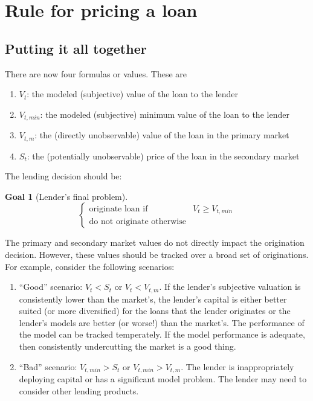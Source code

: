 \documentclass{article}
\theoremstyle{definition}
\newtheorem{goal}{Goal}
\begin{document}
\section{Rule for pricing a loan}


\subsection{Putting it all together}


There are now four formulas or values.  These are

\begin{enumerate}
	\item \(V_t\): the modeled (subjective) value of the loan to the lender
	\item \(V_{t, min}\): the modeled (subjective) minimum value of the loan to the lender
	\item \(V_{t, m}\): the (directly unobservable) value of the loan in the primary market
	\item \(S_t\): the (potentially unobservable) price of the loan in the secondary market
	
\end{enumerate}

The lending decision should be:


\begin{goal}[Lender's final problem] \label{lender3}
	\[
	\left\{
	\begin{array}{ll}
	\text{originate loan if} & V_t \geq V_{t, min}\\
	\text{do not originate otherwise} 
	\end{array} \right.
	\]
	
\end{goal}

The primary and secondary market values do not directly impact the origination decision.  However, these values should be tracked over a broad set of originations.  For example, consider the following scenarios:

\begin{enumerate}
	\item ``Good'' scenario:  \(V_t<S_t\) or \(V_t<V_{t, m}\).  If the lender's subjective valuation is consistently lower than the market's, the lender's capital is either better suited (or more diversified) for the loans that the lender originates or the lender's models are better (or worse!) than the market's.  The performance of the model can be tracked temperately.  If the model performance is adequate, then consistently undercutting the  market is a good thing.  
	\item ``Bad'' scenario: \(V_{t, min}>S_t\) or \(V_{t, min}>V_{t, m}\).  The lender is inappropriately deploying capital or has a significant model problem.  The lender may need to consider other lending products.  
\end{enumerate}
\end{document}
